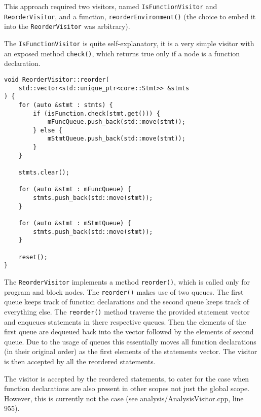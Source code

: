 This approach required two visitors, named
\texttt{IsFunctionVisitor} and \\ \texttt{ReorderVisitor}, and a
function, \texttt{reorderEnvironment()} (the choice to embed it
into the \texttt{ReorderVisitor} was arbitrary).

The \texttt{IsFunctionVisitor} is quite self-explanatory, it is
a very simple visitor with an exposed method \texttt{check()},
which returns true only if a node is a function declaration.

\begin{lstlisting}[caption={The \texttt{reorder()} method in the
\texttt{ReorderVisitor} class (preprocess/ReorderVisitor.cpp).}]
void ReorderVisitor::reorder(
    std::vector<std::unique_ptr<core::Stmt>> &stmts
) {
    for (auto &stmt : stmts) {
        if (isFunction.check(stmt.get())) {
            mFuncQueue.push_back(std::move(stmt));
        } else {
            mStmtQueue.push_back(std::move(stmt));
        }
    }

    stmts.clear();

    for (auto &stmt : mFuncQueue) {
        stmts.push_back(std::move(stmt));
    }

    for (auto &stmt : mStmtQueue) {
        stmts.push_back(std::move(stmt));
    }

    reset();
}
\end{lstlisting}

The \texttt{ReorderVisitor} implements a method
\texttt{reorder()}, which is called only for program and block
nodes. The \texttt{reorder()} makes use of two queues. The first
queue keeps track of function declarations and the second queue
keeps track of everything else. The \texttt{reorder()} method
traverse the provided statement vector and enqueues statements
in there respective queues. Then the elements of the first queue
are dequeued back into the vector followed by  the elements of
second queue. Due to the usage of queues this essentially moves
all function declarations (in their original order) as the first
elements of the statements vector. The visitor is then accepted
by all the reordered statements.

\begin{note}
The visitor is accepted by the reordered statements, to cater
for the case when function declarations are also present in
other scopes not just the global scope. However, this is
currently not the case (see analysis/AnalysisVisitor.cpp, line
955).
\end{note}

